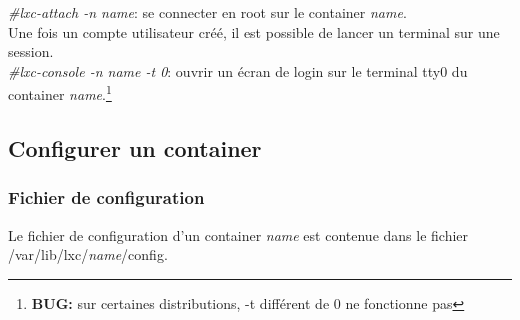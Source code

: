 \documentclass[twoside]{article}
\begin{document}
\emph{\#lxc-attach -n name}: se connecter en root sur le container \emph{name}.\\
Une fois un compte utilisateur cr\'e\'e, il est possible de lancer un terminal sur une session.\\

\emph{\#lxc-console -n name -t 0}: ouvrir un \'ecran de login sur le terminal tty0 du container \emph{name}.\footnote{\textbf{BUG:} sur certaines distributions, -t diff\'erent de 0 ne fonctionne pas}\\

\subsection{Configurer un container}
\subsubsection{Fichier de configuration}
Le fichier de configuration d'un container \emph{name} est contenue dans le fichier /var/lib/lxc/\emph{name}/config.
\end{document}
